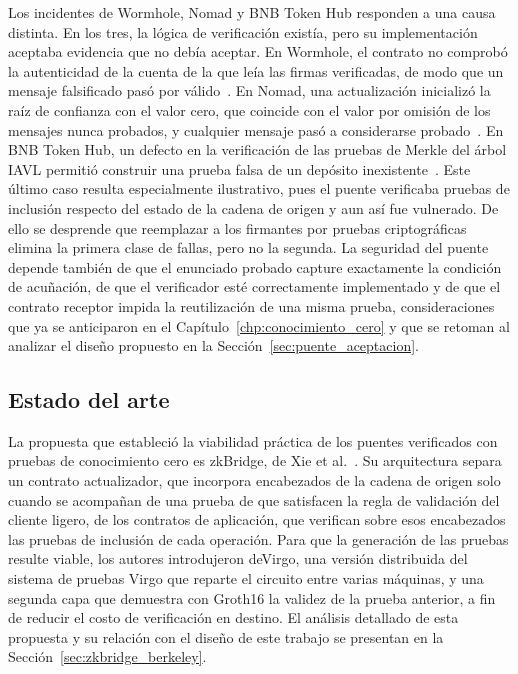 Los incidentes de Wormhole, Nomad y BNB Token Hub responden a una causa distinta. En los tres, la
lógica de verificación existía, pero su implementación aceptaba evidencia que no debía aceptar.
En Wormhole, el contrato no comprobó la autenticidad de la cuenta de la que leía las firmas
verificadas, de modo que un mensaje falsificado pasó por válido~\cite{wormholeincident}. En
Nomad, una actualización inicializó la raíz de confianza con el valor cero, que coincide con el
valor por omisión de los mensajes nunca probados, y cualquier mensaje pasó a considerarse
probado~\cite{nomadrca}. En BNB Token Hub, un defecto en la verificación de las pruebas de
Merkle del árbol IAVL permitió construir una prueba falsa de un depósito
inexistente~\cite{verichainsbnb}. Este último caso resulta especialmente ilustrativo, pues el
puente verificaba pruebas de inclusión respecto del estado de la cadena de origen y aun así fue
vulnerado. De ello se desprende que reemplazar a los firmantes por pruebas criptográficas elimina
la primera clase de fallas, pero no la segunda. La seguridad del puente depende también de que el
enunciado probado capture exactamente la condición de acuñación, de que el verificador esté
correctamente implementado y de que el contrato receptor impida la reutilización de una misma
prueba, consideraciones que ya se anticiparon en el Capítulo~\ref{chp:conocimiento_cero} y que se
retoman al analizar el diseño propuesto en la Sección~\ref{sec:puente_aceptacion}.

\subsection{Estado del arte}
\label{sec:puentes_estado_arte}

La propuesta que estableció la viabilidad práctica de los puentes verificados con pruebas de
conocimiento cero es zkBridge, de Xie et al.~\cite{xie2022zkbridge}. Su arquitectura separa un
contrato actualizador, que incorpora encabezados de la cadena de origen solo cuando se acompañan
de una prueba de que satisfacen la regla de validación del cliente ligero, de los contratos de
aplicación, que verifican sobre esos encabezados las pruebas de inclusión de cada operación. Para
que la generación de las pruebas resulte viable, los autores introdujeron deVirgo, una versión
distribuida del sistema de pruebas Virgo que reparte el circuito entre varias máquinas, y una
segunda capa que demuestra con Groth16 la validez de la prueba anterior, a fin de reducir el
costo de verificación en destino. El análisis detallado de esta propuesta y su relación con el
diseño de este trabajo se presentan en la Sección~\ref{sec:zkbridge_berkeley}.

